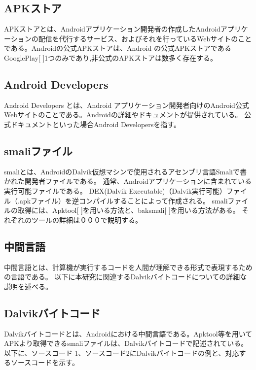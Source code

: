 \subsection{APKストア}
APKストアとは、Androidアプリケーション開発者の作成したAndroidアプリケーションの配信を代行するサービス、およびそれを行っているWebサイトのことである。Androidの公式APKストアは、Android の公式APKストアであるGooglePlay[ ]1つのみであり,非公式のAPKストアは数多く存在する。


\subsection{Android Developers}
Android Developers とは、Android アプリケーション開発者向けのAndroid公式Webサイトのことである。Androidの詳細やドキュメントが提供されている。
公式ドキュメントといった場合Android Developersを指す。


\subsection{smaliファイル}
smaliとは、AndroidのDalvik仮想マシンで使用されるアセンブリ言語Smaliで書かれた開発者ファイルである。
通常、Androidアプリケーションに含まれている実行可能ファイルである。
DEX(Dalvik Executable)（Dalvik実行可能）ファイル（.apkファイル）を逆コンパイルすることによって作成される。
smaliファイルの取得には、Apktool[ ]を用いる方法と、baksmali[ ]を用いる方法がある。
それぞれのツールの詳細は０００で説明する。


\subsection{中間言語}
中間言語とは、計算機が実行するコードを人間が理解できる形式で表現するための言語である。
以下に本研究に関連するDalvikバイトコードについての詳細な説明を述べる。


\subsection{Dalvikバイトコード}
Dalvikバイトコードとは、Androidにおける中間言語である。Apktool等を用いてAPKより取得できるsmaliファイルは、Dalvikバイトコードで記述されている。以下に、ソースコード 1、ソースコード2にDalvikバイトコードの例と、対応するソースコードを示す。


